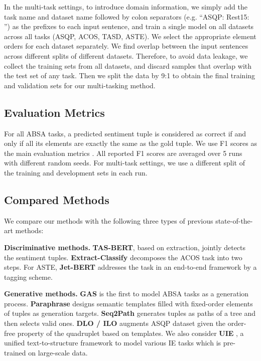 \documentclass[11pt]{article}
\begin{document}
In the multi-task settings, 
to introduce domain information,
we simply add the task name and dataset name followed by colon separators (e.g. ``ASQP: Rest15: '') as the prefixes to each input sentence, and train a single model on all datasets across all tasks (ASQP, ACOS, TASD, ASTE).
We select the appropriate element orders for each dataset separately.
We find overlap between the input sentences across different splits of different datasets. Therefore, to avoid data leakage, we collect the training sets from all datasets, and discard samples that overlap with the test set of any task. Then we split the data by 9:1 to obtain the final training and validation sets for our multi-tasking method.

\subsection{Evaluation Metrics}

For all ABSA tasks, a predicted sentiment tuple is considered as correct if and only if all its elements are exactly the same as the gold tuple. We use F1 scores as the main evaluation metrics \cite{zhang-etal-2021-aspect, mao-etal-2022-seq2path}.
All reported F1 scores are averaged over 5 runs with different random seeds. 
For multi-task settings, we use a different split of the training and development sets in each run.

\subsection{Compared Methods}
\label{sec:compared-methods}
We compare our methods with the following three types of previous state-of-the-art methods:

    \textbf{Discriminative methods.}
    \textbf{TAS-BERT}, based on extraction, \cite{DBLP:conf/aaai/WanYDLQP20} jointly detects the sentiment tuples. \textbf{Extract-Classify} \cite{cai-etal-2021-aspect} decomposes the ACOS task into two steps. For ASTE, \textbf{Jet-BERT} \cite{xu-etal-2020-position} addresses the task in an end-to-end framework by a tagging scheme.
    
    \textbf{Generative methods.}
    \textbf{GAS} \cite{zhang-etal-2021-towards-generative} is the first to model ABSA tasks as a generation process. \textbf{Paraphrase} \cite{zhang-etal-2021-aspect} designs semantic templates filled with fixed-order elements of tuples as generation targets. \textbf{Seq2Path} \cite{mao-etal-2022-seq2path} generates tuples as paths of a tree and then selects valid ones. \textbf{DLO / ILO} \cite{hu-etal-2022-improving-aspect}
    augments ASQP dataset given the order-free property of the quadruplet based on templates. 
    We also consider \textbf{UIE} \cite{lu-etal-2022-unified}, a unified text-to-structure framework to model various IE tasks which is pre-trained on large-scale data.
\end{document}

